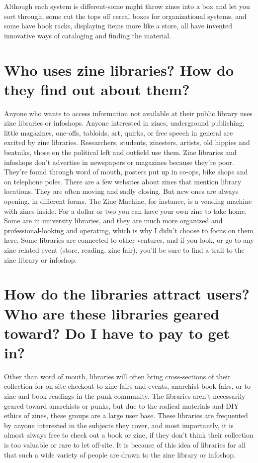 \documentclass[output=paper]{langscibook}
\begin{document}
Although each system is different-some might throw zines into a box and
let you sort through, some cut the tops off cereal boxes for
organizational systems, and some have book racks, displaying items more
like a store, all have invented innovative ways of cataloging and
finding the material.

\hypertarget{who-uses-zine-libraries-how-do-they-find-out-about-them}{%
\section*{Who uses zine libraries? How do they find out about
them?}\label{who-uses-zine-libraries-how-do-they-find-out-about-them}}

Anyone who wants to access information not available at their public
library uses zine libraries or infoshops. Anyone interested in zines,
underground publishing, little magazines, one-offs, tabloids, art,
quirks, or free speech in general are excited by zine libraries.
Researchers, students, zinesters, artists, old hippies and beatniks,
those on the political left and outfield use them. Zine libraries and
infoshops don't advertise in newspapers or magazines because they're
poor. They're found through word of mouth, posters put up in co-ops,
bike shops and on telephone poles. There are a few websites about zines
that mention library locations. They are often moving and sadly closing.
But new ones are always opening, in different forms. The Zine Machine,
for instance, is a vending machine with zines inside. For a dollar or
two you can have your own zine to take home. Some are in university
libraries, and they are much more organized and professional-looking and
operating, which is why I didn't choose to focus on them here. Some
libraries are connected to other ventures, and if you look, or go to any
zine-related event (store, reading, zine fair), you'll be sure to find a
trail to the zine library or infoshop.

\hypertarget{how-do-the-libraries-attract-users-who-are-these-libraries-geared-toward-do-i-have-to-pay-to-get-in}{%
\section*{How do the libraries attract users? Who are these libraries
geared toward? Do I have to pay to get
in?}\label{how-do-the-libraries-attract-users-who-are-these-libraries-geared-toward-do-i-have-to-pay-to-get-in}}

Other than word of mouth, libraries will often bring cross-sections of
their collection for on-site checkout to zine fairs and events,
anarchist book fairs, or to zine and book readings in the punk
community. The libraries aren't necessarily geared toward anarchists or
punks, but due to the radical materials and DIY ethics of zines, these
groups are a large user base. These libraries are frequented by anyone
interested in the subjects they cover, and most importantly, it is
almost always free to check out a book or zine, if they don't think
their collection is too valuable or rare to let off-site. It is because
of this idea of libraries for all that such a wide variety of people are
drawn to the zine library or infoshop.
\end{document}
